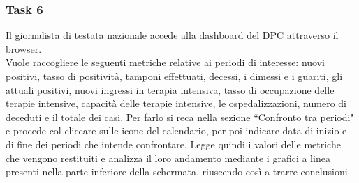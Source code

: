 \subsubsection{Task 6}
\label{sss:cw-task-6}

Il giornalista di testata nazionale accede alla dashboard del DPC attraverso il browser.\\
Vuole raccogliere le seguenti metriche relative ai periodi di interesse: nuovi positivi, tasso di positività, tamponi effettuati, decessi, i dimessi e i guariti, gli attuali positivi, nuovi ingressi in terapia intensiva, tasso di occupazione delle terapie intensive, capacità delle terapie intensive, le ospedalizzazioni, numero di deceduti e il totale dei casi.
Per farlo si reca nella sezione ``Confronto tra periodi" e procede col cliccare sulle icone del calendario, per poi indicare data di inizio e di fine dei periodi che intende confrontare.
Legge quindi i valori delle metriche che vengono restituiti e analizza il loro andamento mediante i grafici a linea presenti nella parte inferiore della schermata, riuscendo così a trarre conclusioni. 